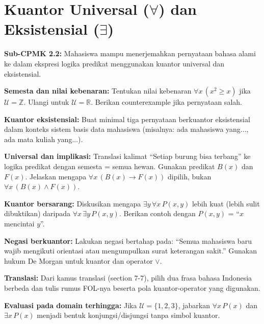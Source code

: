 \documentclass[../main]{subfiles}
\begin{document}
\chapter{Kuantor Universal ($\forall$) dan Eksistensial ($\exists$)}

\begin{subcpmk}
  \item \textbf{Sub-CPMK 2.2:} Mahasiswa mampu menerjemahkan pernyataan bahasa alami ke dalam ekspresi logika predikat menggunakan kuantor universal dan eksistensial.
\end{subcpmk}










\begin{aktivitas}
  \item \textbf{Semesta dan nilai kebenaran:} Tentukan nilai kebenaran $\forall x \, (x^2 \ge x)$ jika $\mathcal{U} = \mathbb{Z}$. Ulangi untuk $\mathcal{U} = \mathbb{R}$. Berikan counterexample jika pernyataan salah.
  \item \textbf{Kuantor eksistensial:} Buat minimal tiga pernyataan berkuantor eksistensial dalam konteks sistem basis data mahasiswa (misalnya: ada mahasiswa yang..., ada mata kuliah yang...).
  \item \textbf{Universal dan implikasi:} Translasi kalimat ``Setiap burung bisa terbang'' ke logika predikat dengan semesta = semua hewan. Gunakan predikat $B(x)$ dan $F(x)$. Jelaskan mengapa $\forall x \, (B(x) \rightarrow F(x))$ dipilih, bukan $\forall x \, (B(x) \land F(x))$.
  \item \textbf{Kuantor bersarang:} Diskusikan mengapa $\exists y \, \forall x \, P(x,y)$ lebih kuat (lebih sulit dibuktikan) daripada $\forall x \, \exists y \, P(x,y)$. Berikan contoh dengan $P(x,y)$ = ``$x$ mencintai $y$''.
  \item \textbf{Negasi berkuantor:} Lakukan negasi bertahap pada: ``Semua mahasiswa baru wajib mengikuti orientasi atau mengumpulkan surat keterangan sakit.'' Gunakan hukum De Morgan untuk kuantor dan operator $\vee$.
  \item \textbf{Translasi:} Dari kamus translasi (section 7-7), pilih dua frasa bahasa Indonesia berbeda dan tulis rumus FOL-nya beserta pola kuantor-operator yang digunakan.
  \item \textbf{Evaluasi pada domain terhingga:} Jika $\mathcal{U} = \{1, 2, 3\}$, jabarkan $\forall x \, P(x)$ dan $\exists x \, P(x)$ menjadi bentuk konjungsi/disjungsi tanpa simbol kuantor.
\end{aktivitas}
\end{document}
